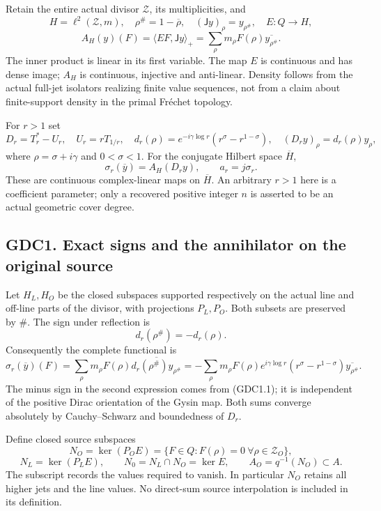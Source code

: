 Retain the entire actual divisor \(\mathscr Z\), its multiplicities, and
\[
H=\ell^2(\mathscr Z,m),\quad \rho^\#=1-\overline\rho,
\quad (\mathsf Jy)_\rho=y_{\rho^\#},\quad
E:Q\to H,
\] \[
A_H(y)(F)=\langle EF,\mathsf Jy\rangle_+
=\sum_\rho m_\rho F(\rho)\overline{y_{\rho^\#}}.
\tag{GDC0.3}
\] The inner product is linear in its first variable. The map \(E\) is
continuous and has dense image; \(A_H\) is continuous, injective and
anti-linear. Density follows from the actual full-jet isolators
realizing finite value sequences, not from a claim about finite-support
density in the primal Fréchet topology.

For \(r>1\) set \[
D_r=T_r^*-U_r,\quad U_r=rT_{1/r},\quad
d_r(\rho)=e^{-i\gamma\log r}(r^\sigma-r^{1-\sigma}),
\quad(D_ry)_\rho=d_r(\rho)y_\rho,
\tag{GDC0.4}
\] where \(\rho=\sigma+i\gamma\) and \(0<\sigma<1\). For the conjugate
Hilbert space \(\overline H\), \[
\sigma_r(\overline y)=A_H(D_ry),\qquad a_r=j\sigma_r.
\tag{GDC0.5}
\] These are continuous complex-linear maps on \(\overline H\). An
arbitrary \(r>1\) here is a coefficient parameter; only a recovered
positive integer \(n\) is asserted to be an actual geometric cover
degree.

\subsection{GDC1. Exact signs and the annihilator on the original
source}\label{gdc1.-exact-signs-and-the-annihilator-on-the-original-source}

Let \(H_L,H_O\) be the closed subspaces supported respectively on the
actual line and off-line parts of the divisor, with projections
\(P_L,P_O\). Both subsets are preserved by \(\#\). The sign under
reflection is \[
d_r(\rho^\#)=-d_r(\rho).
\tag{GDC1.1}
\] Consequently the complete functional is \[
\sigma_r(\overline y)(F)
=\sum_\rho m_\rho F(\rho)
 \overline{d_r(\rho^\#)y_{\rho^\#}}
=-\sum_\rho m_\rho F(\rho)e^{i\gamma\log r}
 (r^\sigma-r^{1-\sigma})\overline{y_{\rho^\#}}.
\tag{GDC1.2}
\] The minus sign in the second expression comes from (GDC1.1); it is
independent of the positive Dirac orientation of the Gysin map. Both
sums converge absolutely by Cauchy--Schwarz and boundedness of \(D_r\).

Define closed source subspaces \[
N_O=\ker(P_OE)=\{F\in Q:F(\rho)=0\ \forall\rho\in\mathscr Z_O\},
\] \[
N_L=\ker(P_LE),\qquad N_0=N_L\cap N_O=\ker E,
\qquad A_O=q^{-1}(N_O)\subset A.
\tag{GDC1.3}
\] The subscript records the values required to vanish. In particular
\(N_O\) retains all higher jets and the line values. No direct-sum
source interpolation is included in its definition.

